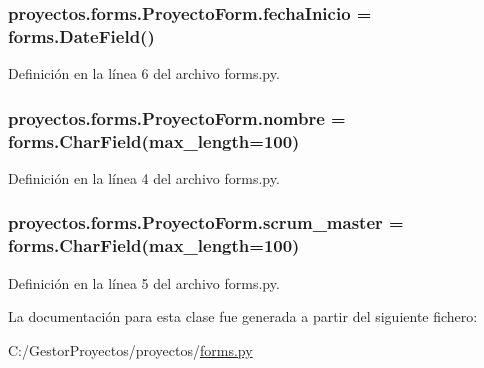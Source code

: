 \subsubsection[{\texorpdfstring{fecha\+Inicio}{fechaInicio}}]{\setlength{\rightskip}{0pt plus 5cm}proyectos.\+forms.\+Proyecto\+Form.\+fecha\+Inicio = forms.\+Date\+Field()\hspace{0.3cm}{\ttfamily [static]}}\hypertarget{classproyectos_1_1forms_1_1_proyecto_form_adb7967b0733bfba0c98d006bd648251e}{}\label{classproyectos_1_1forms_1_1_proyecto_form_adb7967b0733bfba0c98d006bd648251e}


Definición en la línea 6 del archivo forms.\+py.

\subsubsection[{\texorpdfstring{nombre}{nombre}}]{\setlength{\rightskip}{0pt plus 5cm}proyectos.\+forms.\+Proyecto\+Form.\+nombre = forms.\+Char\+Field(max\+\_\+length=100)\hspace{0.3cm}{\ttfamily [static]}}\hypertarget{classproyectos_1_1forms_1_1_proyecto_form_a9f0c10ba92bde23f65580ea11e4f8a30}{}\label{classproyectos_1_1forms_1_1_proyecto_form_a9f0c10ba92bde23f65580ea11e4f8a30}


Definición en la línea 4 del archivo forms.\+py.

\subsubsection[{\texorpdfstring{scrum\+\_\+master}{scrum_master}}]{\setlength{\rightskip}{0pt plus 5cm}proyectos.\+forms.\+Proyecto\+Form.\+scrum\+\_\+master = forms.\+Char\+Field(max\+\_\+length=100)\hspace{0.3cm}{\ttfamily [static]}}\hypertarget{classproyectos_1_1forms_1_1_proyecto_form_aa2dedba3703c69b6ac69f5373ab5a071}{}\label{classproyectos_1_1forms_1_1_proyecto_form_aa2dedba3703c69b6ac69f5373ab5a071}


Definición en la línea 5 del archivo forms.\+py.



La documentación para esta clase fue generada a partir del siguiente fichero\+:\begin{DoxyCompactItemize}
\item 
C\+:/\+Gestor\+Proyectos/proyectos/\hyperlink{proyectos_2forms_8py}{forms.\+py}\end{DoxyCompactItemize}
